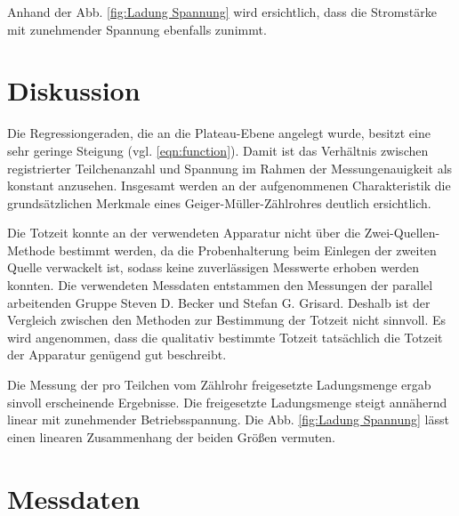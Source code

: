 Anhand der Abb. \ref{fig:Ladung Spannung} wird ersichtlich, dass die Stromstärke
mit zunehmender Spannung ebenfalls zunimmt.

\section{Diskussion}

Die Regressiongeraden, die an die Plateau-Ebene angelegt wurde,
besitzt eine sehr geringe Steigung (vgl. \ref{eqn:function}).
Damit ist das Verhältnis zwischen registrierter Teilchenanzahl und Spannung
im Rahmen der Messungenauigkeit als konstant anzusehen. Insgesamt werden
an der aufgenommenen Charakteristik die grundsätzlichen Merkmale eines
Geiger-Müller-Zählrohres deutlich ersichtlich.

Die Totzeit konnte an der verwendeten Apparatur nicht über die Zwei-Quellen-Methode
bestimmt werden, da die Probenhalterung beim Einlegen der zweiten Quelle
verwackelt ist, sodass keine zuverlässigen Messwerte erhoben werden konnten.
Die verwendeten Messdaten entstammen den Messungen der parallel arbeitenden
Gruppe Steven D. Becker und Stefan G. Grisard.
Deshalb ist der Vergleich zwischen den Methoden zur Bestimmung der Totzeit
nicht sinnvoll. Es wird angenommen, dass die qualitativ bestimmte
Totzeit tatsächlich die Totzeit der Apparatur genügend gut beschreibt.

Die Messung der pro Teilchen vom Zählrohr freigesetzte Ladungsmenge ergab
sinvoll erscheinende Ergebnisse. Die freigesetzte Ladungsmenge steigt
annähernd linear mit zunehmender Betriebsspannung. Die Abb. \ref{fig:Ladung Spannung}
lässt einen linearen Zusammenhang der beiden Größen vermuten.

\section{Messdaten}

